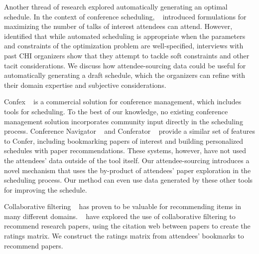 \documentclass[letterpaper]{article}
\begin{document}
Another thread of research explored automatically generating an optimal schedule. In the context of conference scheduling, ~\cite{AutomaticScheduling} introduced formulations for maximizing the number of talks of interest attendees can attend. However, ~\cite{CobiUIST2013} identified that while automated scheduling is appropriate when the parameters and constraints of the optimization problem are well-specified, interviews with past CHI organizers show that they attempt to tackle soft constraints and other tacit considerations. We discuss how attendee-sourcing data could be useful for automatically generating  a draft schedule, which the organizers can refine with their domain expertise and subjective considerations.

Confex ~\cite{Confex} is a commercial solution for conference management, which includes tools for scheduling. To the best of our knowledge, no existing conference management solution incorporates community input directly in the scheduling process. Conference Navigator ~\cite{ConferenceNavigator} and Conferator ~\cite{ConferenceAnatomy} provide a similar set of features to Confer, including bookmarking papers of interest and building personalized schedules with paper recommendations. These systems, however, have not used the attendees' data outside of the tool itself. Our attendee-sourcing introduces a novel mechanism that uses the by-product of attendees' paper exploration in the scheduling process. Our method can even use data generated by these other tools for improving the schedule.

Collaborative filtering ~\cite{CollaborativeFiltering} has proven to be valuable for recommending items in many different domains. ~\cite{CitationRecommendation} have explored the use of collaborative filtering to recommend research papers, using the citation web between papers to create the ratings matrix. We construct the ratings matrix from attendees' bookmarks to recommend papers.
\end{document}
